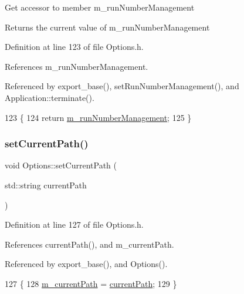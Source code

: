 Get accessor to member m\+\_\+run\+Number\+Management \begin{DoxyReturn}{Returns}
the current value of m\+\_\+run\+Number\+Management 
\end{DoxyReturn}


Definition at line 123 of file Options.\+h.



References m\+\_\+run\+Number\+Management.



Referenced by export\+\_\+base(), set\+Run\+Number\+Management(), and Application\+::terminate().


\begin{DoxyCode}
123                                     \{
124                 \textcolor{keywordflow}{return} \hyperlink{classOptions_a2ad2d67b98fc5fbea4cbbd781ccb6183}{m\_runNumberManagement};
125         \}
\end{DoxyCode}
\mbox{\label{classOptions_a3cebd8308183414ef2e0de0e7922c87a}} 
\subsubsection{\texorpdfstring{set\+Current\+Path()}{setCurrentPath()}}
{\footnotesize\ttfamily void Options\+::set\+Current\+Path (\begin{DoxyParamCaption}\item[{std\+::string}]{current\+Path }\end{DoxyParamCaption})\hspace{0.3cm}{\ttfamily [inline]}}



Definition at line 127 of file Options.\+h.



References current\+Path(), and m\+\_\+current\+Path.



Referenced by export\+\_\+base(), and Options().


\begin{DoxyCode}
127                                                     \{
128                 \hyperlink{classOptions_a9d82ad17fc1fd2315fc8a9e8d0d34f33}{m\_currentPath} = \hyperlink{classOptions_ab9cf7442a712fe8593f6cf5cfff36a5d}{currentPath};
129         \}
\end{DoxyCode}
\mbox{\label{classOptions_ae6f39f4b0b4bd260fbb5a2f0b5f4786e}} 
